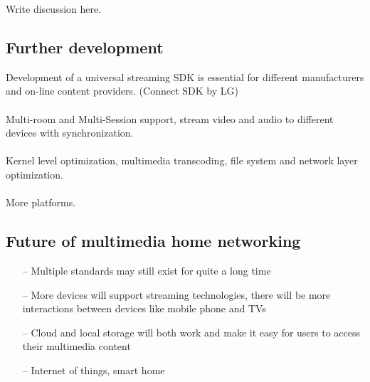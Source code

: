 
Write discussion here.

\subsection{Further development}
Development of a universal streaming SDK is essential for different
manufacturers and on-line content providers. (Connect SDK by LG)\\
\\
Multi-room and Multi-Session support, stream video and audio to different
devices with synchronization.\\
\\
Kernel level optimization, multimedia transcoding, file system and network layer
optimization.\\
\\
More platforms.
\subsection{Future of multimedia home networking}
\begin{itemize}
\item[--] Multiple standards may still exist for quite a long time
\item[--] More devices will support streaming technologies, there will be more interactions between devices like mobile phone and TVs
\item[--] Cloud and local storage will both work and make it easy for users to access their multimedia content
\item[--] Internet of things, smart home
\end{itemize}